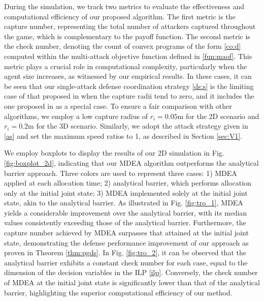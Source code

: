 \documentclass[journal]{IEEEtran}
\newcommand{\1}{\mathbf{1}}
\begin{document}
During the simulation, we track two metrics to evaluate the effectiveness and computational efficiency of our proposed algorithm. The first metric is the capture number, representing the total number of attackers captured throughout the game, which is complementary to the payoff function. The second metric is the check number, denoting the count of convex programs of the form \eqref{co:d} computed within the multi-attack objective function defined in \eqref{fun:maof}. This metric plays a crucial role in computational complexity, particularly when the agent size increases, as witnessed by our empirical results. In these cases, it can be seen that our single-attack defense coordination strategy \eqref{ds:s} is the limiting case of that proposed in \cite{yan2019task} when the capture radii tend to zero, and it includes the one proposed in \cite{yan2022matching} as a special case. To ensure a fair comparison with other algorithms, we employ a low capture radius of $r_i=0.05\text{m}$ for the 2D scenario and $r_i=0.2\text{m}$ for the 3D scenario. Similarly, we adopt the attack strategy given in \eqref{as} and set the maximum speed ratios to 1, as described in Section \ref{sec:V1}.

We employ boxplots to display the results of our 2D simulation in Fig. \ref{fig:boxplot_2d}, indicating that our MDEA algorithm outperforms the analytical barrier approach. Three colors are used to represent three cases: 1) MDEA applied at each allocation time; 2) analytical barrier, which performs allocation only at the initial joint state; 3) MDEA implemented solely at the initial joint state, akin to the analytical barrier. As illustrated in Fig. \ref{fig:tro_1}, MDEA yields a considerable improvement over the analytical barrier, with its median values consistently exceeding those of the analytical barrier. Furthermore, the capture number achieved by MDEA surpasses that attained at the initial joint state, demonstrating the defense performance improvement of our approach as proven in Theorem \ref{thm:pgds}. In Fig. \ref{fig:tro_2}, it can be observed that the analytical barrier exhibits a constant check number for each case, equal to the dimension of the decision variables in the ILP \eqref{ilp}. Conversely, the check number of MDEA at the initial joint state is significantly lower than that of the analytical barrier, highlighting the superior computational efficiency of our method.
\end{document}
